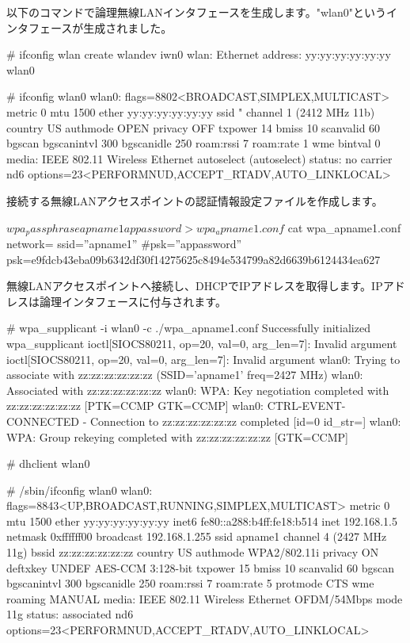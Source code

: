 \documentclass[mingoth,a4paper]{jsarticle}
\begin{document}
以下のコマンドで論理無線LANインタフェースを生成します。"wlan0"というインタフェースが生成されました。

\begin{commandline}
# ifconfig wlan create wlandev iwn0
wlan: Ethernet address: yy:yy:yy:yy:yy:yy
wlan0

# ifconfig wlan0
wlan0: flags=8802<BROADCAST,SIMPLEX,MULTICAST> metric 0 mtu 1500
        ether yy:yy:yy:yy:yy:yy
        ssid " channel 1 (2412 MHz 11b)
        country US authmode OPEN privacy OFF txpower 14 bmiss 10 scanvalid 60
        bgscan bgscanintvl 300 bgscanidle 250 roam:rssi 7 roam:rate 1 wme
        bintval 0
        media: IEEE 802.11 Wireless Ethernet autoselect (autoselect)
        status: no carrier
        nd6 options=23<PERFORMNUD,ACCEPT_RTADV,AUTO_LINKLOCAL>
\end{commandline}

接続する無線LANアクセスポイントの認証情報設定ファイルを作成します。

\begin{commandline}
$ wpa_passphrase apname1 appassword > wpa_apname1.conf
$ cat wpa_apname1.conf
network={
        ssid=''apname1''
        #psk=''appassword''
        psk=e9fdcb43eba09b6342df30f14275625c8494e534799a82d6639b6124434ea627
}
\end{commandline}

無線LANアクセスポイントへ接続し、DHCPでIPアドレスを取得します。IPアドレスは論理インタフェースに付与されます。

\begin{commandline}
# wpa_supplicant -i wlan0 -c ./wpa_apname1.conf
Successfully initialized wpa_supplicant
ioctl[SIOCS80211, op=20, val=0, arg_len=7]: Invalid argument
ioctl[SIOCS80211, op=20, val=0, arg_len=7]: Invalid argument
wlan0: Trying to associate with zz:zz:zz:zz:zz:zz (SSID='apname1' freq=2427 MHz)
wlan0: Associated with zz:zz:zz:zz:zz:zz
wlan0: WPA: Key negotiation completed with zz:zz:zz:zz:zz:zz [PTK=CCMP GTK=CCMP]
wlan0: CTRL-EVENT-CONNECTED - Connection to zz:zz:zz:zz:zz:zz completed [id=0 id_str=]
wlan0: WPA: Group rekeying completed with zz:zz:zz:zz:zz:zz [GTK=CCMP]
\end{commandline}

\begin{commandline}
# dhclient wlan0

# /sbin/ifconfig wlan0
wlan0: flags=8843<UP,BROADCAST,RUNNING,SIMPLEX,MULTICAST> metric 0 mtu 1500
        ether yy:yy:yy:yy:yy:yy
        inet6 fe80::a288:b4ff:fe18:b514%
        inet 192.168.1.5 netmask 0xffffff00 broadcast 192.168.1.255
        ssid apname1 channel 4 (2427 MHz 11g) bssid zz:zz:zz:zz:zz:zz
        country US authmode WPA2/802.11i privacy ON deftxkey UNDEF
        AES-CCM 3:128-bit txpower 15 bmiss 10 scanvalid 60 bgscan
        bgscanintvl 300 bgscanidle 250 roam:rssi 7 roam:rate 5 protmode CTS
        wme roaming MANUAL
        media: IEEE 802.11 Wireless Ethernet OFDM/54Mbps mode 11g
        status: associated
        nd6 options=23<PERFORMNUD,ACCEPT_RTADV,AUTO_LINKLOCAL>
\end{commandline}
\end{document}
